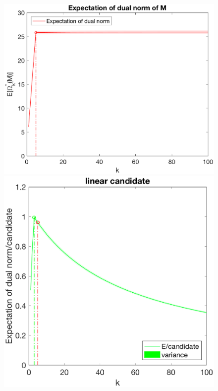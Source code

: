 \documentclass[12pt]{article}
\begin{document}
\begin{figure}[h]
    \begin{minipage}[c]{.3\linewidth}
        \centering
        \includegraphics[width=\linewidth]{Fig/dualnorm-u0ones-k0-5.eps}
    \end{minipage}
    \hfill%
    \begin{minipage}[c]{.3\linewidth}
        \centering
        \includegraphics[width=\linewidth]{Fig/dualnorm-u0rand-k0-5-candidatelin.eps}

\end{minipage}
\end{figure}
\end{document}
